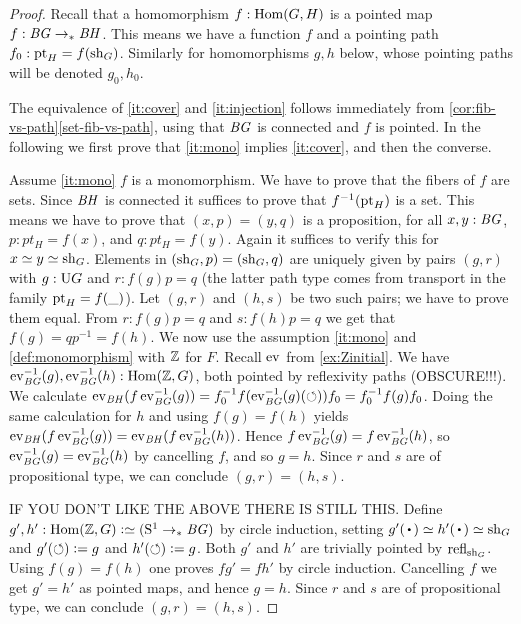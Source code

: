\begin{proof}
  
Recall that a homomorphism $f: \Hom(G,H)$ is a pointed map $f: \mathit{B}\mathit{G}\to_\ast\mathit{B}\mathit{H}$.
This means we have a function $f$ and a pointing path $f_0 : \mathrm{pt}_H = f(\mathrm{sh}_G)$. 
Similarly for homomorphisms $g,h$ below, whose pointing paths will be denoted $g_0,h_0$.

The equivalence of \ref{it:cover} and \ref{it:injection} follows
immediately from \cref{cor:fib-vs-path}\ref{set-fib-vs-path}, using
that $\mathit{B}\mathit{G}$ is connected and $f$ is pointed.
In the following we first prove that \ref{it:mono} implies \ref{it:cover},
and then the converse.

Assume \ref{it:mono} $f$ is a monomorphism. 
We have to prove that the fibers of $f$ are sets.
Since $\mathit{B}\mathit{H}$ is connected it suffices to prove that $f^{-1}(\mathrm{pt}_H)$ is a set. 
This means we have to prove that $(x,p) = (y,q)$ is a proposition,
for all $x,y:\mathit{B}\mathit{G}$, $p: pt_H = f(x)$, and $q: pt_H = f(y)$.
Again it suffices to verify this for $x\jdeq y\jdeq\sh_G$.
Elements in $(\mathrm{sh}_G,p) = (\mathrm{sh}_G,q)$ are uniquely given by pairs $(g,r)$
with $g: \mathrm{U} G$ and $r : f(g)p = q$
(the latter path type comes from transport in the family $\mathrm{pt}_H = f(\_)$).
Let $(g,r)$ and $(h,s)$ be two such pairs; we have to prove them equal. 
From $r : f(g)p = q$ and $s : f(h)p = q$ we get that $f(g)=qp^{-1}=f(h)$.
We now use the assumption \ref{it:mono} and
\cref{def:monomorphism} with $\mathbb{Z}$ for $F$.
Recall $\ev$ from \cref{ex:Zinitial}. 
We have $\ev_{\BG}^{-1}(g),\ev_{\BG}^{-1}(h) : \Hom(\ZZ,G)$,
both pointed by reflexivity paths (OBSCURE!!!). We calculate
$\ev_{\BH}(f\ev_{\BG}^{-1}(g)) = f_0^{-1} f(\ev_{\BG}^{-1}(g)(\Sloop)) f_0 = f_0^{-1} f(g) f_0$.
Doing the same calculation for $h$ and using $f(g)=f(h)$ yields
$\ev_{\BH}(f\ev_{\BG}^{-1}(g)) = \ev_{\BH}(f\ev_{\BG}^{-1}(h))$.
Hence $f\ev_{\BG}^{-1}(g) = f\ev_{\BG}^{-1}(h)$, so
$\ev_{\BG}^{-1}(g) = \ev_{\BG}^{-1}(h)$ by cancelling $f$, and so $g=h$. 
Since $r$ and $s$ are of propositional type, we can conclude $(g,r) = (h,s)$.

IF YOU DON'T LIKE THE ABOVE THERE IS STILL THIS.
Define $g',h': \Hom(\ZZ,G) \defeq (\Sc\ptdto \BG)$
by circle induction, setting $g'(\base)\jdeq h'(\base)\jdeq\sh_G$
and $g'(\circlearrowleft)\mathrel{\vcentcolon=} g$ and $h'(\circlearrowleft)\mathrel{\vcentcolon=} g$. Both $g'$ and $h'$
are trivially pointed by $\refl{\sh_G}$. Using $f(g)=f(h)$ one
proves $fg'=fh'$ by circle induction. Cancelling $f$ we get $g'=h'$
as pointed maps, and hence $g=h$. 
Since $r$ and $s$ are of propositional type, we can conclude $(g,r) = (h,s)$.


\end{proof}
